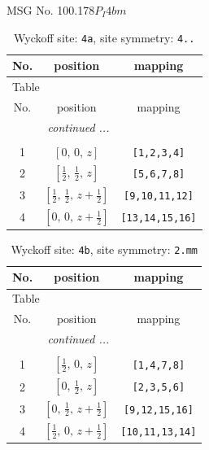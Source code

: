\documentclass[fleqn,8pt]{jsarticle}
\begin{document}
\setcounter{MaxMatrixCols}{32}

\renewcommand{\tablename}{Table~}
\renewcommand{\figurename}{Figure~}
\begin{center}
\LARGE
MSG No. 100.178\quad$P_{I}4bm$
\end{center}
\renewcommand{\arraystretch}{1.2}
\begin{longtable}{ccc}
\caption{Wyckoff site: {\tt 4a}, site symmetry: {\tt 4..}}
 \\
 \hline \hline
No. & position & mapping \\ \hline \endfirsthead

\multicolumn{2}{l}{\tablename\ \thetable{}} \\
 \hline \hline
No. & position & mapping \\ \hline \endhead

 \hline \hline
\multicolumn{2}{r}{\footnotesize\it continued ...} \\ \endfoot

 \hline \hline
\multicolumn{2}{r}{} \\ \endlastfoot

1 & $\left[ 0,\, 0,\, z \right]$ & {\tt [1,2,3,4]} \\ \hline
2 & $\left[ \frac{1}{2},\, \frac{1}{2},\, z \right]$ & {\tt [5,6,7,8]} \\ \hline
3 & $\left[ \frac{1}{2},\, \frac{1}{2},\, z + \frac{1}{2} \right]$ & {\tt [9,10,11,12]} \\ \hline
4 & $\left[ 0,\, 0,\, z + \frac{1}{2} \right]$ & {\tt [13,14,15,16]} \\
\end{longtable}
\renewcommand{\arraystretch}{1.2}
\begin{longtable}{ccc}
\caption{Wyckoff site: {\tt 4b}, site symmetry: {\tt 2.mm}}
 \\
 \hline \hline
No. & position & mapping \\ \hline \endfirsthead

\multicolumn{2}{l}{\tablename\ \thetable{}} \\
 \hline \hline
No. & position & mapping \\ \hline \endhead

 \hline \hline
\multicolumn{2}{r}{\footnotesize\it continued ...} \\ \endfoot

 \hline \hline
\multicolumn{2}{r}{} \\ \endlastfoot

1 & $\left[ \frac{1}{2},\, 0,\, z \right]$ & {\tt [1,4,7,8]} \\ \hline
2 & $\left[ 0,\, \frac{1}{2},\, z \right]$ & {\tt [2,3,5,6]} \\ \hline
3 & $\left[ 0,\, \frac{1}{2},\, z + \frac{1}{2} \right]$ & {\tt [9,12,15,16]} \\ \hline
4 & $\left[ \frac{1}{2},\, 0,\, z + \frac{1}{2} \right]$ & {\tt [10,11,13,14]} \\
\end{longtable}
\end{document}
